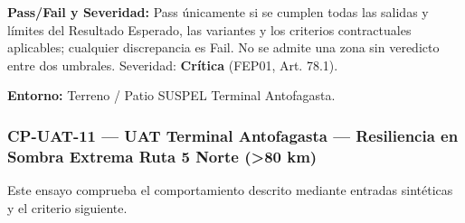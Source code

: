 \par\noindent\textbf{Pass/Fail y Severidad:} Pass únicamente si se cumplen todas las salidas y límites del Resultado Esperado, las variantes y los criterios contractuales aplicables; cualquier discrepancia es Fail. No se admite una zona sin veredicto entre dos umbrales. Severidad: \textbf{Crítica} (FEP01, Art. 78.1).\par
\par\noindent\textbf{Entorno:} Terreno / Patio SUSPEL Terminal Antofagasta.\par






\subsubsection*{CP-UAT-11 — UAT Terminal Antofagasta — Resiliencia en Sombra Extrema Ruta 5 Norte (>80 km)}\label{sec:9-cp-uat-11}
Este ensayo comprueba el comportamiento descrito mediante entradas sintéticas y el criterio siguiente.

